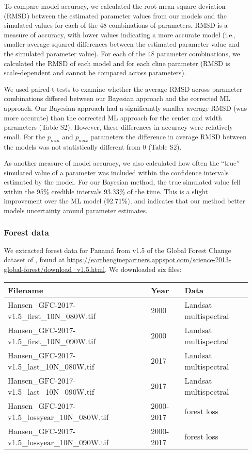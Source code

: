\documentclass[]{article}
\begin{document}
To compare model accuracy, we calculated the root-mean-square deviation
(RMSD) between the estimated parameter values from our models and the
simulated values for each of the 48 combinations of parameters. RMSD is
a measure of accuracy, with lower values indicating a more accurate
model (i.e., smaller average squared differences between the estimated
parameter value and the simulated parameter value). For each of the 48
parameter combinations, we calculated the RMSD of each model and for
each cline parameter (RMSD is scale-dependent and cannot be compared
across parameters).

We used paired t-tests to examine whether the average RMSD across
parameter combinations differed between our Bayesian approach and the
corrected ML approach. Our Bayesian approach had a significantly smaller
average RMSD (was more accurate) than the corrected ML approach for the
center and width parameters (Table S2). However, these differences in
accuracy were relatively small. For the \(p_{min}\) and \(p_{max}\)
parameters the difference in average RMSD between the models was not
statistically different from 0 (Table S2).

As another measure of model accuracy, we also calculated how often the
``true'' simulated value of a parameter was included within the
confidence intervals estimated by the model. For our Bayesian method,
the true simulated value fell within the 95\% credible intervals 93.33\%
of the time. This is a slight improvement over the ML model (92.71\%),
and indicates that our method better models uncertainty around parameter
estimates.

\subsubsection{Forest data}\label{forest-data}

We extracted forest data for Panamá from v1.5 of the Global Forest
Change dataset of \citealt{Hansen:2013iy}, found at
\url{https://earthenginepartners.appspot.com/science-2013-global-forest/download_v1.5.html}.
We downloaded six files:

\begin{longtable}[]{@{}lll@{}}
\toprule
Filename & Year & Data\tabularnewline
\midrule
\endhead
Hansen\_GFC-2017-v1.5\_first\_10N\_080W.tif & 2000 & Landsat
multispectral\tabularnewline
Hansen\_GFC-2017-v1.5\_first\_10N\_090W.tif & 2000 & Landsat
multispectral\tabularnewline
Hansen\_GFC-2017-v1.5\_last\_10N\_080W.tif & 2017 & Landsat
multispectral\tabularnewline
Hansen\_GFC-2017-v1.5\_last\_10N\_090W.tif & 2017 & Landsat
multispectral\tabularnewline
Hansen\_GFC-2017-v1.5\_lossyear\_10N\_080W.tif & 2000-2017 & forest
loss\tabularnewline
Hansen\_GFC-2017-v1.5\_lossyear\_10N\_090W.tif & 2000-2017 & forest
loss\tabularnewline
\bottomrule
\end{longtable}
\end{document}
